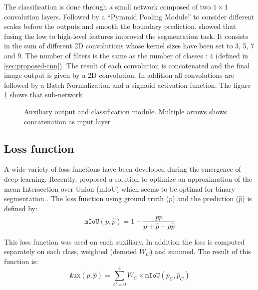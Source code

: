 \documentclass[../thesis.tex]{subfiles}
\begin{document}
    The classification is done through a small network composed of two $1\times1$ convolution layers. Followed by a ``Pyramid Pooling Module'' to consider different scales before the outputs and smooth the boundary prediction. \cite{zhao2017pyramid} showed that fusing the low to high-level features improved the segmentation task. It consists in the sum of different 2D convolutions whose kernel sizes have been set to 3, 5, 7 and 9. The number of filters is the same as the number of classes : $4$ (defined in \ref{sec:proposed-cnn}). The result of each convolution is concatenated and the final image output is given by a 2D convolution. In addition all convolutions are followed by a Batch Normalization and a sigmoid activation function. The figure \ref{fig:07-diagram2} shows that sub-network.
    
    \begin{figure}[H]
        \centering
        
        \caption{Auxiliary output and classification module. Multiple arrows shows concatenation as input layer}
        \label{fig:07-diagram2}
    \end{figure}
    
    \subsection{Loss function}
    \label{sec:loss-function}
    
    A wide variety of loss functions have been developed during the emergence of deep-learning. Recently, \cite{MIoU2016} proposed a solution to optimize an approximation of the mean Intersection over Union (mIoU) which seems to be optimal for binary segmentation \cite{zhou2019iou}. The loss function using ground truth ($p$) and the prediction ($\hat{p}$) is defined by:
    \begin{equation} \texttt{mIoU}(p, \hat{p}) = 1 - \frac{p\hat{p}}{p+\hat{p} - p\hat{p}} \end{equation}
    
    This loss function was used on each auxiliary. In addition the loss is computed separately on each class, weighted (denoted $W_C$) and summed. The result of this function is:
    \begin{equation} \texttt{Aux}(p, \hat{p}) = \sum_{C=0}^{4} W_C \times \texttt{mIoU}(p_C, \hat{p}_C) \end{equation}
    
    
\end{document}
